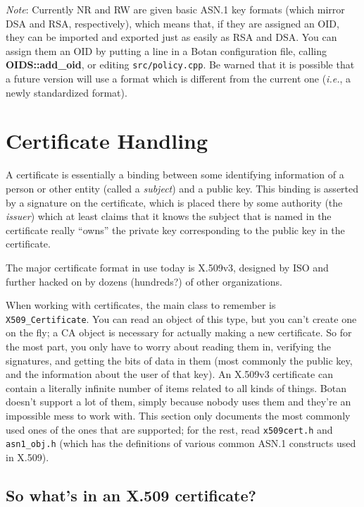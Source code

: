 \documentclass{article}
\newcommand{\filename}[1]{\texttt{#1}}
\newcommand{\function}[1]{\textbf{#1}}
\newcommand{\type}[1]{\texttt{#1}}
\newcommand{\ie}[0]{\emph{i.e.}}
\begin{document}
\emph{Note}: Currently NR and RW are given basic ASN.1 key formats (which
mirror DSA and RSA, respectively), which means that, if they are assigned an
OID, they can be imported and exported just as easily as RSA and DSA. You can
assign them an OID by putting a line in a Botan configuration file, calling
\function{OIDS::add\_oid}, or editing \filename{src/policy.cpp}. Be warned that
it is possible that a future version will use a format which is different from
the current one (\ie, a newly standardized format).

\pagebreak
\section{Certificate Handling}

A certificate is essentially a binding between some identifying information of
a person or other entity (called a \emph{subject}) and a public key. This
binding is asserted by a signature on the certificate, which is placed there by
some authority (the \emph{issuer}) which at least claims that it knows the
subject that is named in the certificate really ``owns'' the private key
corresponding to the public key in the certificate.

The major certificate format in use today is X.509v3, designed by ISO and
further hacked on by dozens (hundreds?) of other organizations.

When working with certificates, the main class to remember is
\type{X509\_Certificate}. You can read an object of this type, but you can't
create one on the fly; a CA object is necessary for actually making a new
certificate. So for the most part, you only have to worry about reading them
in, verifying the signatures, and getting the bits of data in them (most
commonly the public key, and the information about the user of that key). An
X.509v3 certificate can contain a literally infinite number of items related to
all kinds of things. Botan doesn't support a lot of them, simply because nobody
uses them and they're an impossible mess to work with. This section only
documents the most commonly used ones of the ones that are supported; for the
rest, read \filename{x509cert.h} and \filename{asn1\_obj.h} (which has the
definitions of various common ASN.1 constructs used in X.509).

\subsection{So what's in an X.509 certificate?}
\end{document}
